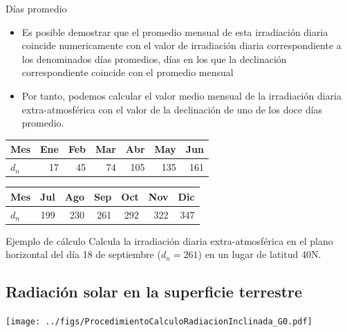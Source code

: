 \documentclass[xcolor={usenames,svgnames,dvipsnames}]{beamer}
\begin{document}
\begin{frame}[label={sec:org9f157b1}]{Días promedio}
\begin{itemize}
\item Es posible demostrar que el \alert{promedio mensual} de esta irradiación
diaria \alert{coincide numericamente} con el valor de irradiación diaria
correspondiente a los denominados \alert{días promedios}, días en los que
la declinación correspondiente coincide con el promedio mensual

\item Por tanto, podemos calcular el valor medio mensual de la irradiación
diaria extra-atmosférica con el valor de la declinación de uno de los
doce días promedio.
\end{itemize}

\begin{center}
\begin{tabular}{lrrrrrr}
Mes & Ene & Feb & Mar & Abr & May & Jun\\
\hline
\(d_n\) & 17 & 45 & 74 & 105 & 135 & 161\\
\end{tabular}
\end{center}

\begin{center}
\begin{tabular}{lrrrrrr}
Mes & Jul & Ago & Sep & Oct & Nov & Dic\\
\hline
\(d_n\) & 199 & 230 & 261 & 292 & 322 & 347\\
\end{tabular}
\end{center}
\end{frame}

\begin{frame}[label={sec:org622e4b7}]{Ejemplo de cálculo}
Calcula la irradiación diaria extra-atmosférica en el plano horizontal del día 18 de septiembre (\(d_n = 261\)) en un lugar de latitud 40\degree N.
\end{frame}

\subsection{Radiación solar en la superficie terrestre}
\label{sec:org3ef07a8}
\begin{frame}[label={sec:orgfd6d574}]{}
\begin{center}
\texttt{[image: ../figs/ProcedimientoCalculoRadiacionInclinada\_G0.pdf]}
\end{center}
\end{frame}
\end{document}
